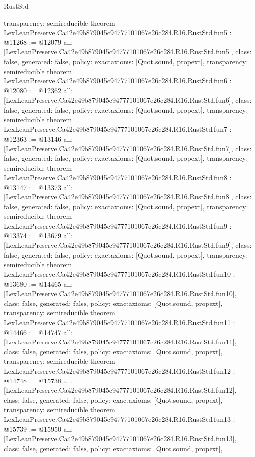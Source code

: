 \begin{lexlean}{RustStd}
\begin{coremodule}
{  transparency: semireducible
}
theorem LexLeanPreserve.Ca42e49b879045c94777101067e26c284.R16.RustStd.fun5 : @11268 := @12079 {
  all: [LexLeanPreserve.Ca42e49b879045c94777101067e26c284.R16.RustStd.fun5],
  class: false,
  generated: false,
  policy: exact{axioms: [Quot.sound, propext]},
  transparency: semireducible
}
theorem LexLeanPreserve.Ca42e49b879045c94777101067e26c284.R16.RustStd.fun6 : @12080 := @12362 {
  all: [LexLeanPreserve.Ca42e49b879045c94777101067e26c284.R16.RustStd.fun6],
  class: false,
  generated: false,
  policy: exact{axioms: [Quot.sound, propext]},
  transparency: semireducible
}
theorem LexLeanPreserve.Ca42e49b879045c94777101067e26c284.R16.RustStd.fun7 : @12363 := @13146 {
  all: [LexLeanPreserve.Ca42e49b879045c94777101067e26c284.R16.RustStd.fun7],
  class: false,
  generated: false,
  policy: exact{axioms: [Quot.sound, propext]},
  transparency: semireducible
}
theorem LexLeanPreserve.Ca42e49b879045c94777101067e26c284.R16.RustStd.fun8 : @13147 := @13373 {
  all: [LexLeanPreserve.Ca42e49b879045c94777101067e26c284.R16.RustStd.fun8],
  class: false,
  generated: false,
  policy: exact{axioms: [Quot.sound, propext]},
  transparency: semireducible
}
theorem LexLeanPreserve.Ca42e49b879045c94777101067e26c284.R16.RustStd.fun9 : @13374 := @13679 {
  all: [LexLeanPreserve.Ca42e49b879045c94777101067e26c284.R16.RustStd.fun9],
  class: false,
  generated: false,
  policy: exact{axioms: [Quot.sound, propext]},
  transparency: semireducible
}
theorem LexLeanPreserve.Ca42e49b879045c94777101067e26c284.R16.RustStd.fun10 : @13680 := @14465 {
  all: [LexLeanPreserve.Ca42e49b879045c94777101067e26c284.R16.RustStd.fun10],
  class: false,
  generated: false,
  policy: exact{axioms: [Quot.sound, propext]},
  transparency: semireducible
}
theorem LexLeanPreserve.Ca42e49b879045c94777101067e26c284.R16.RustStd.fun11 : @14466 := @14747 {
  all: [LexLeanPreserve.Ca42e49b879045c94777101067e26c284.R16.RustStd.fun11],
  class: false,
  generated: false,
  policy: exact{axioms: [Quot.sound, propext]},
  transparency: semireducible
}
theorem LexLeanPreserve.Ca42e49b879045c94777101067e26c284.R16.RustStd.fun12 : @14748 := @15738 {
  all: [LexLeanPreserve.Ca42e49b879045c94777101067e26c284.R16.RustStd.fun12],
  class: false,
  generated: false,
  policy: exact{axioms: [Quot.sound, propext]},
  transparency: semireducible
}
theorem LexLeanPreserve.Ca42e49b879045c94777101067e26c284.R16.RustStd.fun13 : @15739 := @15950 {
  all: [LexLeanPreserve.Ca42e49b879045c94777101067e26c284.R16.RustStd.fun13],
  class: false,
  generated: false,
  policy: exact{axioms: [Quot.sound, propext]},
}
\end{coremodule}
\end{lexlean}
